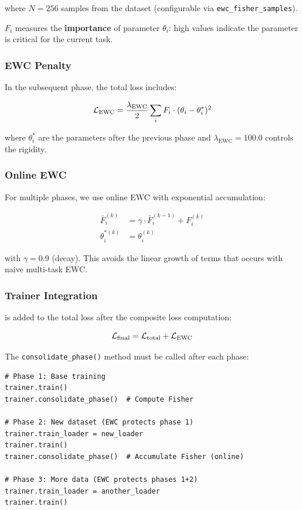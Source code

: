 where $N = 256$ samples from the dataset (configurable via
\texttt{ewc\_fisher\_samples}).

$F_i$ measures the \textbf{importance} of parameter $\theta_i$: high
values indicate the parameter is critical for the current task.

\subsubsection{EWC Penalty}

In the subsequent phase, the total loss includes:

\begin{equation}
    \mathcal{L}_{\text{EWC}} = \frac{\lambda_{\text{EWC}}}{2} \sum_{i} F_i \cdot (\theta_i - \theta_i^*)^2
    \label{eq:ewc_loss}
\end{equation}

where $\theta_i^*$ are the parameters after the previous phase and
$\lambda_{\text{EWC}} = 100.0$ controls the rigidity.

\subsubsection{Online EWC}

For multiple phases, we use online EWC \cite{schwarz2018progress}
with exponential accumulation:

\begin{align}
    \bar{F}_i^{(k)} &= \gamma \cdot \bar{F}_i^{(k-1)} + F_i^{(k)} \label{eq:ewc_online} \\
    \theta_i^{*(k)} &= \theta_i^{(k)}
\end{align}

with $\gamma = 0.9$ (decay). This avoids the linear growth of terms
that occurs with naive multi-task EWC.

\subsubsection{Trainer Integration}

 is added to the total loss after the composite loss
computation:

\begin{equation}
    \mathcal{L}_{\text{final}} = \mathcal{L}_{\text{total}} + \mathcal{L}_{\text{EWC}}
\end{equation}

The \texttt{consolidate\_phase()} method must be called after each phase:

\begin{lstlisting}[caption={EWC usage in training.}]
# Phase 1: Base training
trainer.train()
trainer.consolidate_phase()  # Compute Fisher

# Phase 2: New dataset (EWC protects phase 1)
trainer.train_loader = new_loader
trainer.train()
trainer.consolidate_phase()  # Accumulate Fisher (online)

# Phase 3: More data (EWC protects phases 1+2)
trainer.train_loader = another_loader
trainer.train()
\end{lstlisting}

